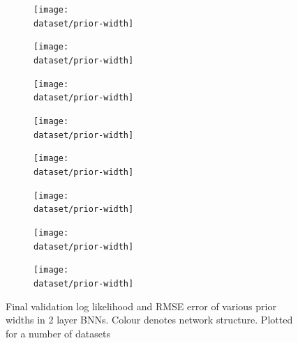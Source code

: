 \begin{figure}[p]
	\def\dataset{\bostonvar}
	\def\dataname{\bostonname}
	\begin{subfigure}{0.48\textwidth}
		\texttt{[image: \\dataset/prior-width]}
		\caption{\dataname}
		\label{fig:prior_width_\dataset}
	\end{subfigure}
	\def\dataset{\concretevar}
	\def\dataname{\concretename}
	\begin{subfigure}{0.48\textwidth}
		\texttt{[image: \\dataset/prior-width]}
		\caption{\dataname}
		\label{fig:prior_width_\dataset}
	\end{subfigure}

	\def\dataset{\energyvar}
	\def\dataname{\energyname}
	\begin{subfigure}{0.48\textwidth}
		\texttt{[image: \\dataset/prior-width]}
		\caption{\dataname}
		\label{fig:prior_width_\dataset}
	\end{subfigure}
	\def\dataset{\kinvar}
	\def\dataname{\kinname}
	\begin{subfigure}{0.48\textwidth}
		\texttt{[image: \\dataset/prior-width]}
		\caption{\dataname}
		\label{fig:prior_width_\dataset}
	\end{subfigure}
	
	\def\dataset{\powervar}
	\def\dataname{\powername}
	\begin{subfigure}{0.48\textwidth}
		\texttt{[image: \\dataset/prior-width]}
		\caption{\dataname}
		\label{fig:prior_width_\dataset}
	\end{subfigure}
	\def\dataset{\proteinvar}
	\def\dataname{\proteinname}
	\begin{subfigure}{0.48\textwidth}
		\texttt{[image: \\dataset/prior-width]}
		\caption{\dataname}
		\label{fig:prior_width_\dataset}
	\end{subfigure}
	
	\def\dataset{\winevar}
	\def\dataname{\winename}
	\begin{subfigure}{0.48\textwidth}
		\texttt{[image: \\dataset/prior-width]}
		\caption{\dataname}
		\label{fig:prior_width_\dataset}
	\end{subfigure}
	\def\dataset{\yachtnvar}
	\def\dataname{\yachtname}
	\begin{subfigure}{0.48\textwidth}
		\texttt{[image: \\dataset/prior-width]}
		\caption{\dataname}
		\label{fig:prior_width_\dataset}
	\end{subfigure}
	
	\caption{Final validation log likelihood and RMSE error of various prior widths in 2 layer BNNs. Colour denotes network structure. Plotted for a number of datasets}
	\label{fig:prior_width}
\end{figure}

